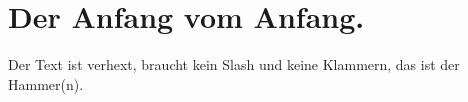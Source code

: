 \documentclass{article}
\begin{document}
    
    \section{Der Anfang vom Anfang.}

    Der Text ist verhext, braucht kein Slash und keine Klammern, 
    das ist der Hammer(n).
\end{document}
